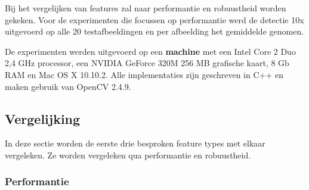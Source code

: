 Bij het vergelijken van features zal naar performantie en robuustheid worden gekeken. Voor de experimenten die focussen op performantie werd de detectie 10x uitgevoerd op alle 20 testafbeeldingen en per afbeelding het gemiddelde genomen.

De experimenten werden uitgevoerd op een \textbf{machine} met een Intel Core 2 Duo 2,4 GHz processor, een NVIDIA GeForce 320M 256 MB grafische kaart, 8 Gb RAM en Mac OS X 10.10.2. Alle implementaties zijn geschreven in C++ en maken gebruik van OpenCV 2.4.9.

\subsection{Vergelijking}
In deze sectie worden de eerste drie besproken feature types met elkaar vergeleken. Ze worden vergeleken qua performantie en robuustheid.


%
%
%

\subsubsection*{Performantie}

